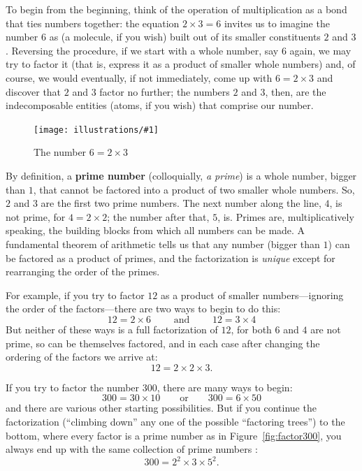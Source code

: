\documentclass[openany]{book}
\newcommand{\ill}[3]{%
   \begin{figure}[H]%
   \vspace{-2ex}
   \centering%
   \texttt{[image: illustrations/\#1]}%
   \caption{#3}%
   \vspace{-2ex}
    \end{figure}}
\theoremstyle{plain}
\theoremstyle{definition}
\begin{document}
 To begin from the beginning, think
of the operation of multiplication as a bond that ties numbers
together: the equation $2\times 3= 6$ invites us to imagine the number
$6$ as (a molecule, if you wish) built out of its smaller constituents
$2$ and $3$.  Reversing the procedure, if we start with a whole
number, say $6$ again, we may try to factor it (that is, express it as
a product of smaller whole numbers) and, of course, we would
eventually, if not immediately, come up with $6 = 2\times 3$ and
discover that $2$ and $3$ factor no further; the numbers $2$ and $3$,
then, are the indecomposable entities (atoms, if you wish) that
comprise our number.

\ill{factor_tree_6}{.3}{The number $6 = 2\times 3$}


By definition, a {\bf prime number}
(colloquially, {\em a prime}) is a whole number, bigger than $1$, that
cannot be factored into a product of two smaller whole numbers. So,
$2$ and $3$ are the first two prime numbers. The next number along the
line, $4$, is not prime, for $4= 2\times 2$; the number after that,
$5$, is. Primes are, multiplicatively speaking, the building blocks
from which all numbers can be made. A fundamental theorem of
arithmetic tells us that any number (bigger than $1$) can be factored
as a product of primes, and the factorization is {\em unique} except
for rearranging the order of the primes.



For example, if you try to factor $12$ as a product of
smaller numbers---ignoring the order of the factors---there are two
ways to begin to do this:
$$
  12 = 2 \times 6 \qquad\text{ and }\qquad   12 = 3 \times 4
$$
But neither of these ways is a full factorization of $12$, for both
$6$ and $4$ are not prime, so can be themselves factored, and in each
case after changing the ordering of the factors we arrive at:
$$
   12= 2 \times 2 \times 3.
$$

If you try to factor the number $300$, there are many
ways to begin:
$$
  300= 30\times 10\qquad\text{or}\qquad 300 = 6 \times 50
$$
and there are various other starting possibilities. But if you
continue the factorization (``climbing down'' any one of the possible
``factoring trees'') to the bottom, where every factor is a prime
number as in Figure~\ref{fig:factor300}, you always end up with the
same collection of prime numbers :
                 $$300 = 2^2\times 3\times 5^2.$$
\end{document}
